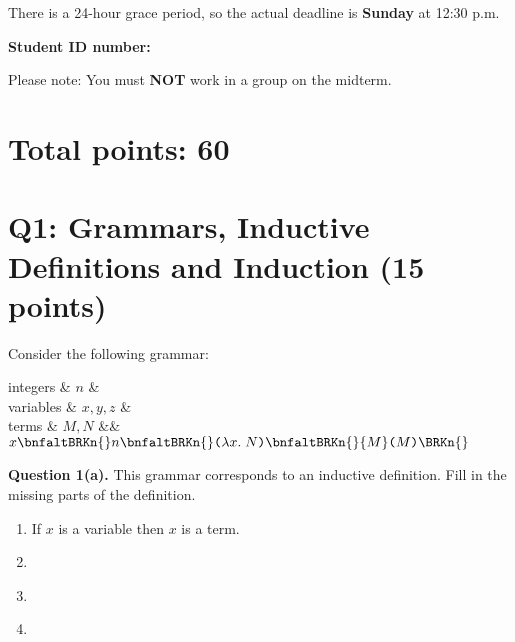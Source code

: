 
\gdef\lecturenumber{Midterm}
\gdef\subsectioncounters{1}

\usepackage{etoolbox}

\newcommand{\blanks}[1]{\ensuremath{\dashuline{\hspace{#1}}}}



\date{Friday, 2022--03--04, 12:30 p.m. to Saturday, 2022--03--05, 12:30 p.m.}



There is a 24-hour grace period, so the actual deadline is \textbf{Sunday} at 12:30 p.m.

\bigskip

\textbf{Student ID number:}  \uline{\hspace*{0.7\textwidth}}

\medskip

Please note: You must \textbf{NOT} work in a group on the midterm.


\section*{Total points: 60}

\section{Q1: Grammars, Inductive Definitions and Induction (15 points)}

Consider the following grammar:

\newcommand{\lcabs}[2]{\texttt(\lambda{#1}.\;{#2}\texttt)}
\newcommand{\lcapp}[2]{{#1}\texttt(#2\texttt)}

\begin{grammar}
integers & $n$ &
\\
variables & $x, y, z$ &
\\
terms  & $M, N$ &\bnfas&
      $x
      \bnfaltBRKn{}
      n
      \bnfaltBRKn{}
      \lcabs{x}{N}
      \bnfaltBRKn{}
      \lcapp{M}{M}
      \BRKn{}
      $
\end{grammar}

\textbf{Question 1(a).} This grammar corresponds to an inductive definition.  Fill in the missing parts of the definition.

\begin{enumerate}
\item If $x$ is a variable then $x$ is a term.

\item
~\\[5ex]

\item
~\\[5ex]

\item
~\\[5ex]

\end{enumerate}


